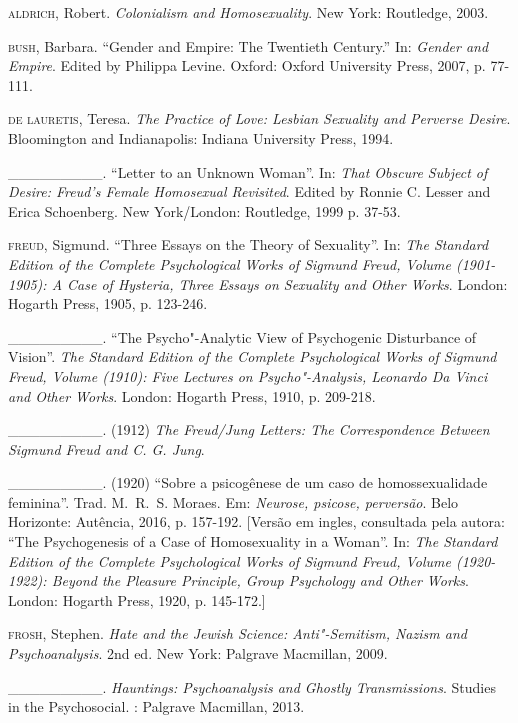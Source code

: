 \begin{Parskip}
\textsc{aldrich}, Robert. \emph{Colonialism and Homosexuality}. New York: Routledge, 2003.

\textsc{bush}, Barbara. ``Gender and Empire: The Twentieth Century.'' In:
\emph{Gender and Empire}. Edited by Philippa Levine. Oxford: Oxford University Press, 2007, p. 77-111.

\textsc{de lauretis}, Teresa. \emph{The Practice of Love: Lesbian Sexuality
and Perverse Desire}. Bloomington and Indianapolis: Indiana University Press, 1994.

\_\_\_\_\_\_\_\_\_. ``Letter to an Unknown Woman''. In: \emph{That Obscure
Subject of Desire: Freud's Female Homosexual Revisited}. Edited by
Ronnie C. Lesser and Erica Schoenberg. New York/London: Routledge, 1999 p. 37-53.

\textsc{freud}, Sigmund. ``Three Essays on the Theory of Sexuality''. In:
\emph{The Standard Edition of the Complete Psychological Works of
Sigmund Freud, Volume  (1901-1905): A Case of Hysteria, Three Essays
on Sexuality and Other Works}. London: Hogarth Press, 1905, p. 123-246.

\_\_\_\_\_\_\_\_\_. ``The Psycho"-Analytic View of Psychogenic Disturbance
of Vision''. \emph{The Standard Edition of the Complete Psychological
Works of Sigmund Freud, Volume  (1910): Five Lectures on
Psycho"-Analysis, Leonardo Da Vinci and Other Works}. London: Hogarth Press, 1910, p. 209-218.

\_\_\_\_\_\_\_\_\_. (1912) \emph{The Freud/Jung Letters: The Correspondence
Between Sigmund Freud and C. G. Jung}.

\_\_\_\_\_\_\_\_\_. (1920) ``Sobre a psicogênese de um caso de homossexualidade
feminina''. Trad. M.~R.~S. Moraes. Em: \emph{Neurose, psicose,
perversão}. Belo Horizonte: Autência, 2016, p. 157-192. {[}Versão em
ingles, consultada pela autora: ``The Psychogenesis of a Case of
Homosexuality in a Woman''. In: \emph{The Standard Edition of the Complete
Psychological Works of Sigmund Freud, Volume  (1920-1922): Beyond
the Pleasure Principle, Group Psychology and Other Works}. London: Hogarth Press, 1920, p. 145-172.{]}

\textsc{frosh}, Stephen. \emph{Hate and the Jewish Science: Anti"-Semitism,
Nazism and Psychoanalysis}. 2nd ed. New York: Palgrave Macmillan, 2009.

\_\_\_\_\_\_\_\_\_. \emph{Hauntings: Psychoanalysis and Ghostly
Transmissions}. Studies in the Psychosocial. : Palgrave Macmillan, 2013.


\end{Parskip}
